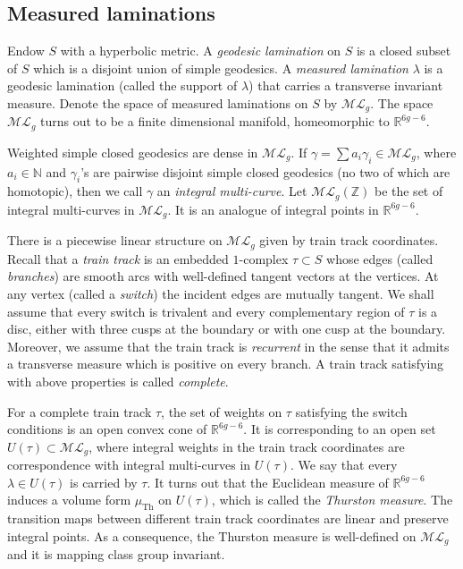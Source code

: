 \documentclass{amsart}
\theoremstyle{plain}
\theoremstyle{definition}
\numberwithin{equation}{section}
\newcommand{\ML}{\mathcal{ML}_g}
\begin{document}
\subsection{Measured laminations}
 Endow $S$ with a hyperbolic metric. A \emph{geodesic lamination} on $S$ is a closed subset of $S$ which is a disjoint union of simple geodesics. A \emph{measured lamination} $\lambda$ is a geodesic lamination (called the support of $\lambda$) that carries a transverse invariant measure. Denote the space of measured laminations on $S$ by $\ML$. 
The space $\ML$ turns out to be a  finite
dimensional manifold, homeomorphic to  $\mathbb{R}^{6g-6}$.

Weighted simple closed geodesics are dense in $\ML$. 
If $\gamma=\sum a_i \gamma_i \in \ML$, where $a_i\in \mathbb{N}$ and $\gamma_i$'s are pairwise disjoint simple closed geodesics (no two of which are homotopic), then we call $\gamma$ an \emph{integral multi-curve}. 
Let $\ML(\mathbb{Z})$ be the set of integral multi-curves in $\ML$.
It is an analogue of integral points in $\mathbb{R}^{6g-6}$. 

There is a piecewise linear structure on $\ML$ given by train track coordinates. 
Recall that a \emph{train track} is an embedded $1$-complex $\tau \subset S$
 whose edges (called \emph{branches}) are smooth arcs with well-defined tangent vectors at
 the vertices.  At any vertex (called a \emph{switch}) the incident edges are mutually
 tangent. We shall assume that every switch is trivalent and  every
 complementary region  of $\tau$ is a disc, either with three cusps at
 the boundary or with one cusp
 at the boundary. Moreover, we assume that the train track is
\emph{recurrent} in the sense that it admits a transverse measure which is positive on every branch.
A train track satisfying with above properties is called \emph{complete}. 

For a complete train track $\tau$, the set of weights on $\tau$ satisfying the switch conditions is an open convex cone of $\mathbb{R}^{6g-6}$. It is corresponding to an open set $U(\tau)\subset \ML$,
where integral weights in the train track coordinates are correspondence with integral multi-curves in $U(\tau)$. We say that every $\lambda\in U(\tau)$ is carried by $\tau$. It turns out that the Euclidean measure of $\mathbb{R}^{6g-6}$ induces a volume form $\mu_{\operatorname{Th}}$ on $U(\tau)$, which is called the \textit{Thurston measure}. 
The transition maps between different train track coordinates are linear and preserve integral points.
As a consequence, the Thurston measure is well-defined on $\ML$ and it is  mapping class group invariant. 
\end{document}
